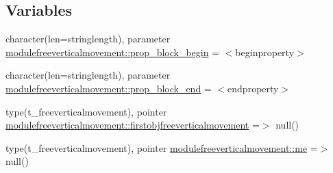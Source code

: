 \subsection*{Variables}
\begin{DoxyCompactItemize}
\item 
character(len=stringlength), parameter \mbox{\hyperlink{namespacemodulefreeverticalmovement_a1ece5e8dc845d51331f4b843dcc6c478}{modulefreeverticalmovement\+::prop\+\_\+block\+\_\+begin}} = \textquotesingle{}$<$beginproperty$>$\textquotesingle{}
\item 
character(len=stringlength), parameter \mbox{\hyperlink{namespacemodulefreeverticalmovement_aa4fffdbed67b4800eea74f1389195f60}{modulefreeverticalmovement\+::prop\+\_\+block\+\_\+end}} = \textquotesingle{}$<$endproperty$>$\textquotesingle{}
\item 
type(t\+\_\+freeverticalmovement), pointer \mbox{\hyperlink{namespacemodulefreeverticalmovement_af05afdb031d50e81aaa92c9b99793254}{modulefreeverticalmovement\+::firstobjfreeverticalmovement}} =$>$ null()
\item 
type(t\+\_\+freeverticalmovement), pointer \mbox{\hyperlink{namespacemodulefreeverticalmovement_a28b010cc15d0e2ac1ad1a9ddf71afb4d}{modulefreeverticalmovement\+::me}} =$>$ null()
\end{DoxyCompactItemize}
